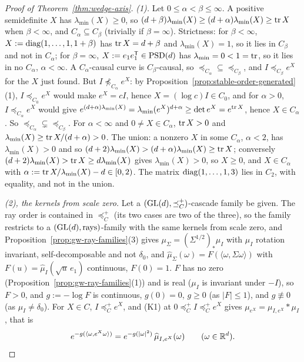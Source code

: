 \begin{proof}[Proof of Theorem~\ref{thm:wedge-axis}]
\emph{(1).} Let $0 \le \alpha < \beta \le \infty$. A positive semidefinite $X$ has $\lambda_{\min}(X) \ge 0$, so
$(d+\beta)\lambda_{\min}(X) \ge (d+\alpha)\lambda_{\min}(X) \ge \operatorname{tr} X$ when $\beta < \infty$, and $C_\alpha
\subseteq C_\beta$ (trivially if $\beta = \infty$). Strictness: for $\beta < \infty$,
$X := \operatorname{diag}(1, \dots, 1, 1 + \beta)$ has $\operatorname{tr} X = d + \beta$ and $\lambda_{\min}(X) = 1$, so it lies in $C_\beta$
and not in $C_\alpha$; for $\beta = \infty$, $X := e_1e_1^{\mathsf{T}} \in \mathrm{PSD}(d)$ has $\lambda_{\min} = 0 < 1 = \operatorname{tr}$,
so it lies in no $C_\alpha$, $\alpha < \infty$. A $C_\alpha$-causal curve is $C_\beta$-causal, so
$\preceq_{C_\alpha} \subseteq \preceq_{C_\beta}$, and $I \preceq_{C_\beta} e^X$ for the $X$ just found. But
$I \not\preceq_{C_\alpha} e^X$: by Proposition~\ref{prop:stable-order-generated}(1), $I \preceq_{C_0} e^X$ would make $e^X = cI$,
hence $X = (\log c)I \in C_0$, and for $\alpha > 0$, $I \preceq_{C_\alpha} e^X$ would give
$e^{(d+\alpha)\lambda_{\min}(X)} = \lambda_{\min}(e^X)^{d+\alpha} \ge \det e^X = e^{\operatorname{tr} X}$, hence $X \in C_\alpha$.
So $\preceq_{C_\alpha} \subsetneq \preceq_{C_\beta}$. For $\alpha < \infty$ and $0 \ne X \in C_\alpha$, $\operatorname{tr} X > 0$ and
$\lambda_{\min}(X) \ge \operatorname{tr} X/(d+\alpha) > 0$. The union: a nonzero $X$ in some $C_\alpha$, $\alpha < 2$, has
$\lambda_{\min}(X) > 0$ and so $(d+2)\lambda_{\min}(X) > (d+\alpha)\lambda_{\min}(X) \ge \operatorname{tr} X$; conversely
$(d+2)\lambda_{\min}(X) > \operatorname{tr} X \ge d\lambda_{\min}(X)$ gives $\lambda_{\min}(X) > 0$, so $X \ge 0$, and
$X \in C_\alpha$ with $\alpha := \operatorname{tr} X/\lambda_{\min}(X) - d \in [0, 2)$. The matrix $\operatorname{diag}(1, \dots, 1, 3)$ lies in
$C_2$, with equality, and not in the union.

\emph{(2), the kernels from scale zero.} Let a $(\mathrm{GL}(d), \preceq^+_C)$-cascade family be given. The ray order is
contained in $\preceq^+_C$ (its two cases are two of the three), so the family restricts to a
$(\mathrm{GL}(d), \text{rays})$-family with the same kernels from scale zero, and
Proposition~\ref{prop:gw-ray-families}(3) gives $\mu_\Sigma = (\Sigma^{1/2})_*\mu_I$ with $\mu_I$ rotation invariant,
self-decomposable and not $\delta_0$, and $\widehat\mu_\Sigma(\omega) = F(\langle\omega,\Sigma\omega\rangle)$ with
$F(u) = \widehat\mu_I(\sqrt u\,e_1)$ continuous, $F(0) = 1$. $F$ has no zero (Proposition~\ref{prop:gw-ray-families}(1)) and is
real ($\mu_I$ is invariant under $-I$), so $F > 0$, and $g := -\log F$ is continuous, $g(0) = 0$, $g \ge 0$ (as
$|F| \le 1$), and $g \not\equiv 0$ (as $\mu_I \ne \delta_0$). For $X \in C$, $I \preceq^+_C e^X$, and (K1) at
$0 \preceq^+_C I \preceq^+_C e^X$ gives $\mu_{e^X} = \mu_{I,e^X} * \mu_I$, that is
\begin{equation}\label{eq:wedge-axis-step}
  e^{-g(\langle\omega, e^X\omega\rangle)} = e^{-g(|\omega|^2)}\,\widehat\mu_{I,e^X}(\omega)
  \qquad (\omega \in \mathbb{R}^d).
\end{equation}


\end{proof}
